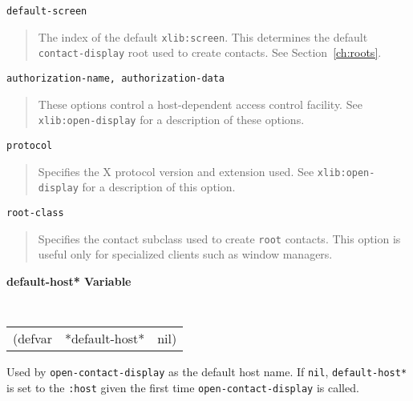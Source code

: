 \begin{flushright} \parbox[t]{6.125in}{
{\tt default-screen}
\begin{quote}
The index of the default {\tt xlib:screen}. This determines the default
{\tt contact-display} root
used to create contacts. See Section~\ref{ch:roots}.
\end{quote}

}\end{flushright}

\begin{flushright} \parbox[t]{6.125in}{
{\tt authorization-name, authorization-data}
\begin{quote}
These options control a host-dependent access control facility.
See {\tt xlib:open-display} for a
description of these options.
\end{quote}

}\end{flushright}

\begin{flushright} \parbox[t]{6.125in}{
{\tt protocol}
\begin{quote}
Specifies the X protocol version and extension used.
See {\tt xlib:open-display} for a
description of this option.
\end{quote}

}\end{flushright}

\begin{flushright} \parbox[t]{6.125in}{
{\tt root-class}
\begin{quote}
Specifies the contact subclass used to create {\tt root} contacts.
This option is useful only for specialized clients such
as window managers.
\end{quote}

}\end{flushright}

{\samepage
{\large {\bf *default-host* \hfill Variable}} 
\begin{flushright} \parbox[t]{6.125in}{
\tt
\begin{tabular}{lll}
\raggedright
(defvar & *default-host* & nil)
\end{tabular}
\rm

}\end{flushright}}

\begin{flushright} \parbox[t]{6.125in}{
Used by {\tt open-contact-display} as the default host name.
If {\tt nil}, {\tt *default-host*} is set
to the {\tt :host} given the first time {\tt open-contact-display} is called.

}\end{flushright}


